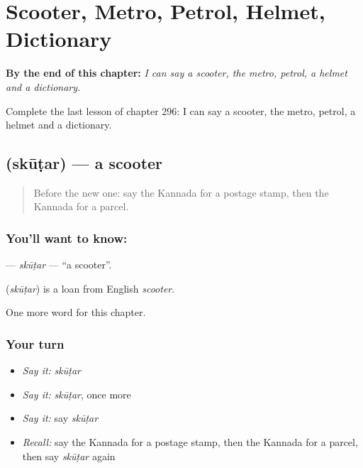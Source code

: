 
\chapter{Scooter, Metro, Petrol, Helmet, Dictionary}
\label{ch:ka-scooter-metro-petrol-helmet-dictionary}

\begin{chapteropening}
\textbf{By the end of this chapter:} \emph{I can say a scooter, the metro, petrol, a helmet and a dictionary.}

Complete the last lesson of chapter 296: I can say a scooter, the metro, petrol, a helmet and a dictionary.
\end{chapteropening}

\section[\texorpdfstring{\kn{ಸ್ಕೂಟರ್} (skūṭar)}{ಸ್ಕೂಟರ್ (skūṭar)}]{ (skūṭar) — a scooter}

\label{lesson:KA-C296-skutar}



\begin{quote}
Before the new one: say the Kannada for a postage stamp, then the Kannada for a parcel.
\end{quote}

\subsection*{You'll want to know: }
\textbf{} — \emph{skūṭar} — \textquotedblleft{}a scooter\textquotedblright{}.

\begin{cousinweb}
\textbf{} (\emph{skūṭar}) is a loan from English \emph{scooter}.
\end{cousinweb}

\begin{grammarlens}[title={What you've built}]
One more word for this chapter.
\end{grammarlens}

\subsection*{Your turn}
\begin{itemize}
\raggedright
  \item \emph{Say it:} \emph{skūṭar}
  \item \emph{Say it:} \emph{skūṭar}, once more
  \item \emph{Say it:} say \emph{skūṭar}
  \item \emph{Recall:} say the Kannada for a postage stamp, then the Kannada for a parcel, then say \emph{skūṭar} again
\end{itemize}

